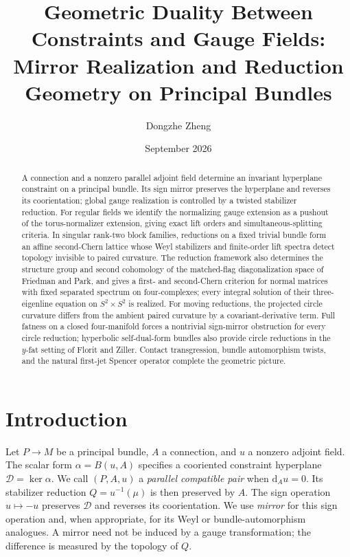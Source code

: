 \documentclass[11pt]{amsart}
\title[Mirror realization and reduction geometry]{Geometric Duality Between Constraints and Gauge Fields:\\Mirror Realization and Reduction Geometry on Principal Bundles}
\author{Dongzhe Zheng}
\date{September 2026}
\newcommand{\dd}{\mathrm d}
\theoremstyle{plain}
\theoremstyle{definition}
\theoremstyle{remark}
\begin{document}
\raggedbottom
\begin{abstract}
A connection and a nonzero parallel adjoint field determine an invariant hyperplane constraint on a principal bundle.  Its sign mirror preserves the hyperplane and reverses its coorientation; global gauge realization is controlled by a twisted stabilizer reduction.  For regular fields we identify the normalizing gauge extension as a pushout of the torus-normalizer extension, giving exact lift orders and simultaneous-splitting criteria.  In singular rank-two block families, reductions on a fixed trivial bundle form an affine second-Chern lattice whose Weyl stabilizers and finite-order lift spectra detect topology invisible to paired curvature.  The reduction framework also determines the structure group and second cohomology of the matched-flag diagonalization space of Friedman and Park, and gives a first- and second-Chern criterion for normal matrices with fixed separated spectrum on four-complexes; every integral solution of their three-eigenline equation on $S^2\times S^2$ is realized.  For moving reductions, the projected circle curvature differs from the ambient paired curvature by a covariant-derivative term.  Full fatness on a closed four-manifold forces a nontrivial sign-mirror obstruction for every circle reduction; hyperbolic self-dual-form bundles also provide circle reductions in the $y$-fat setting of Florit and Ziller.  Contact transgression, bundle automorphism twists, and the natural first-jet Spencer operator complete the geometric picture.
\end{abstract}
\maketitle

\section{Introduction}

Let $P\to M$ be a principal bundle, $A$ a connection, and $u$ a nonzero adjoint field.  The scalar form $\alpha=B(u,A)$ specifies a cooriented constraint hyperplane $\mathcal D=\ker\alpha$.  We call $(P,A,u)$ a \emph{parallel compatible pair} when $\dd_Au=0$.  Its stabilizer reduction $Q=u^{-1}(\mu)$ is then preserved by $A$.  The sign operation $u\mapsto-u$ preserves $\mathcal D$ and reverses its coorientation.  We use \emph{mirror} for this sign operation and, when appropriate, for its Weyl or bundle-automorphism analogues.  A mirror need not be induced by a gauge transformation; the difference is measured by the topology of $Q$.
\end{document}
